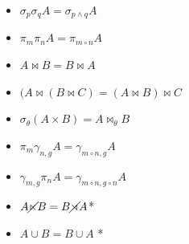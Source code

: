 \begin{itemize}
\item \(\sigma_p \sigma_q A = \sigma_{p \land q} A\)
\item \(\pi_m \pi_{n} A = \pi_{m \circ n} A\)
\item \(A \Join B = B \Join A\)
\item \((A \Join (B \Join C) = (A \Join B) \Join C\)
\item \(\sigma_\theta (A \times B) = A \Join_\theta B\)
\item \(\pi_m \gamma_{n,g} A = \gamma_{m \circ n,g} A \)
\item \(\gamma_{m,g} \pi_n A = \gamma_{m \circ n,g \circ n} A \)
\item \(A \cancel\ltimes B = B \cancel\rtimes A \)*
\item \(A \cup B = B \cup A \) *
\end{itemize}

